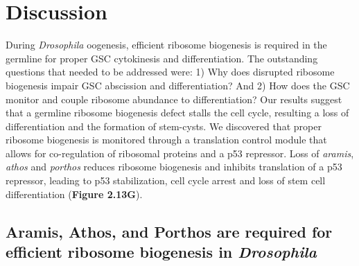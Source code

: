 \documentclass[12pt,oneside]{reedthesis}
\begin{document}
\hypertarget{discussion}{%
\section{Discussion}\label{discussion}}

During \emph{Drosophila} oogenesis, efficient ribosome biogenesis is required in the germline for proper GSC cytokinesis and differentiation. The outstanding questions that needed to be addressed were: 1) Why does disrupted ribosome biogenesis impair GSC abscission and differentiation? And 2) How does the GSC monitor and couple ribosome abundance to differentiation? Our results suggest that a germline ribosome biogenesis defect stalls the cell cycle, resulting a loss of differentiation and the formation of stem-cysts. We discovered that proper ribosome biogenesis is monitored through a translation control module that allows for co-regulation of ribosomal proteins and a p53 repressor. Loss of \emph{aramis}, \emph{athos} and \emph{porthos} reduces ribosome biogenesis and inhibits translation of a p53 repressor, leading to p53 stabilization, cell cycle arrest and loss of stem cell differentiation (\textbf{Figure 2.13G}).

\hypertarget{aramis-athos-and-porthos-are-required-for-efficient-ribosome-biogenesis-in-drosophila}{%
\subsection{\texorpdfstring{Aramis, Athos, and Porthos are required for efficient ribosome biogenesis in \emph{Drosophila}}{Aramis, Athos, and Porthos are required for efficient ribosome biogenesis in Drosophila}}\label{aramis-athos-and-porthos-are-required-for-efficient-ribosome-biogenesis-in-drosophila}}
\end{document}
